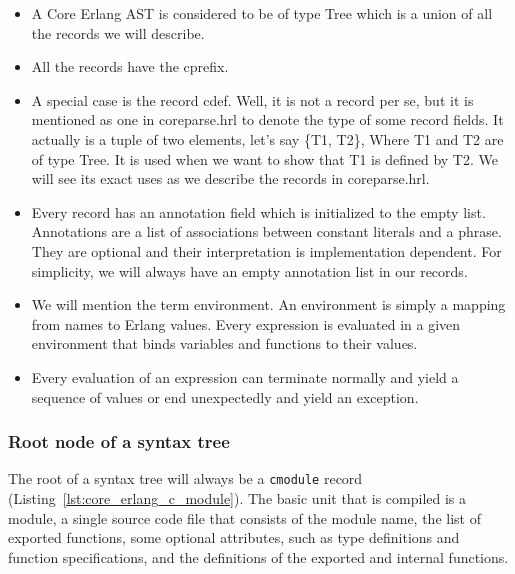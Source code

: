 \begin{itemize}
  \item A Core Erlang AST is considered to be of type Tree which is a union of
    all the records we will describe.
  \item All the records have the c\textunderscore  prefix.
  \item A special case is the record c\textunderscore def. Well, it is not a record per se,
    but it is mentioned as one in core\textunderscore parse.hrl to denote the type of some
    record fields. It actually is a tuple of two elements, let’s say \{T1, T2\},
    Where T1 and T2 are of type Tree. It is used when we want to show that T1
    is defined by T2. We will see its exact uses as we describe the records in
    core\textunderscore parse.hrl.
  \item Every record has an annotation field which is initialized to the empty
    list. Annotations are a list of associations between constant literals and
    a phrase. They are optional and their interpretation is implementation
    dependent. For simplicity, we will always have an empty annotation list in
    our records.
  \item We will mention the term environment. An environment is simply a
    mapping from names to Erlang values. Every expression is evaluated in a
    given environment that binds variables and functions to their values.
  \item Every evaluation of an expression can terminate normally and yield a
    sequence of values or end unexpectedly and yield an exception.
\end{itemize}

\subsubsection{Root node of a syntax tree}


The root of a syntax tree will always be a \texttt{c\textunderscore module} record (Listing~\ref{lst:core_erlang_c_module}). The basic unit that
is compiled is a module, a single source code file that consists of the module
name, the list of exported functions, some optional attributes, such as type
definitions and function specifications, and the definitions of the exported
and internal functions. 

